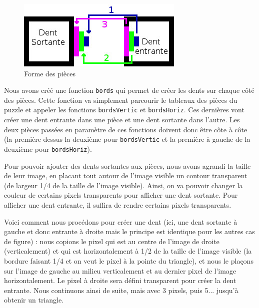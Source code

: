 \documentclass[]{article}
\newcommand{\variable}[1]{\noindent \texttt{#1}}
\begin{document}
\begin{figure}[hpt]
	\center
	\caption{\label{Forme des pièces} Forme des pièces}
	\includegraphics{dents}
\end{figure}

Nous avons créé une fonction \variable{bords} qui permet de créer les dents sur chaque côté des pièces. Cette fonction va simplement parcourir le tableaux des pièces du puzzle et appeler les fonctions \variable{bordsVertic} et \variable{bordsHoriz}. Ces dernières vont créer une dent entrante dans une pièce et une dent sortante dans l'autre. Les deux pièces passées en paramètre de ces fonctions doivent donc être côte à côte (la première dessus la deuxième pour \variable{bordsVertic} et la première à gauche de la deuxième pour \variable{bordsHoriz}).

Pour pouvoir ajouter des dents sortantes aux pièces, nous avons agrandi la taille de leur image, en placant tout autour de l'image visible un contour transparent (de largeur 1/4 de la taille de l'image visible). Ainsi, on va pouvoir changer la couleur de certains pixels transparents pour afficher une dent sortante. Pour afficher une dent entrante, il suffira de rendre certains pixels transparents.

Voici comment nous procédons pour créer une dent (ici, une dent sortante à gauche et donc entrante à droite mais le principe est identique pour les autres cas de figure) : nous copions le pixel qui est au centre de l'image de droite (verticalement) et qui est horizontalement à 1/2 de la taille de l'image visible (la bordure faisant 1/4 et on veut le pixel à la pointe du triangle), et nous le plaçons sur l'image de gauche au milieu verticalement et au dernier pixel de l'image horizontalement. Le pixel à droite sera défini transparent pour créer la dent entrante. Nous continuons ainsi de suite, mais avec 3 pixels, puis 5... jusqu'à obtenir un triangle.

\end{document}
